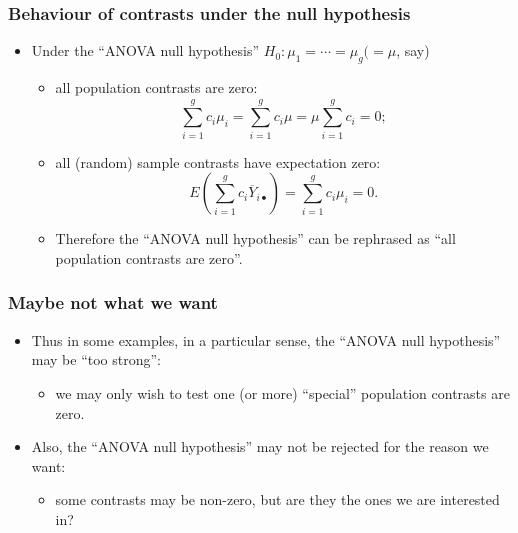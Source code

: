 \documentclass[a4paper]{article}
\begin{document}
\subsubsection{Behaviour of contrasts under the null hypothesis}
\begin{itemize}
	\item Under the ``ANOVA null hypothesis'' \( H_0: \mu_1 = \dotsb = \mu_g (=\mu \), say)
	\begin{itemize}
		\item all population contrasts are zero:
		\[
			\sum_{i=1}^gc_i\mu_i=\sum_{i=1}^gc_i\mu=\mu\sum_{i=1}^gc_i=0;
		\]
		\item all (random) sample contrasts have expectation zero:
		\[
			E \left( \sum_{i=1}^gc_i\overline Y_{i\bullet}\right)=\sum_{i=1}^gc_i\mu_i=0.
		\]
		\item Therefore the ``ANOVA null hypothesis'' can be rephrased as ``all population contrasts are zero''.
	\end{itemize}
\end{itemize}
\subsubsection{Maybe not what we want}
\begin{itemize}
	\item Thus in some examples, in a particular sense, the ``ANOVA null hypothesis'' may be ``too strong'':
	\begin{itemize}
		\item we may only wish to test one (or more) ``special'' population contrasts are zero.
	\end{itemize}
	\item Also, the ``ANOVA null hypothesis'' may not be rejected for the reason we want:
	\begin{itemize}
		\item some contrasts may be non-zero, but are they the ones we are interested in?
	\end{itemize}
\end{itemize}
\end{document}

